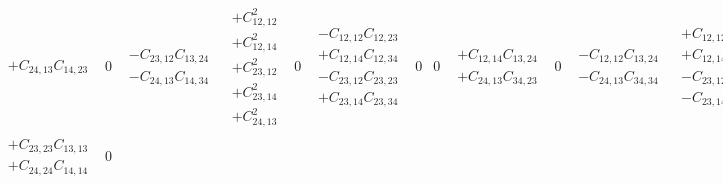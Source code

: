 \documentclass[pra,nofootinbib]{revtex4-1}
\newcommand{\C}[2]{C_{{#1},{#2}}}
\begin{document}
\begin{eqnarray}
\begin{array}{cccccccccccccccc}
\begin{array}{c}
     + \C{24}{13}\C{14}{23}
     \end{array} &
     0 &
     \begin{array}{c}
     - \C{23}{12}\C{13}{24} \\
     - \C{24}{13}\C{14}{34}
     \end{array} &
     \begin{array}{c}
     + \C{12}{12}^2 \\
     + \C{12}{14}^2 \\
     + \C{23}{12}^2 \\
     + \C{23}{14}^2 \\
     + \C{24}{13}^2
     \end{array} &
     0 &
     \begin{array}{c}
     - \C{12}{12}\C{12}{23} \\
     + \C{12}{14}\C{12}{34} \\
     - \C{23}{12}\C{23}{23} \\
     + \C{23}{14}\C{23}{34}
     \end{array} &
     0 &
     0 &
     \begin{array}{c}
     + \C{12}{14}\C{13}{24} \\
     + \C{24}{13}\C{34}{23}
     \end{array} &
     0 &
     \begin{array}{c}
     - \C{12}{12}\C{13}{24} \\
     - \C{24}{13}\C{34}{34}
     \end{array} &
     \begin{array}{c}
     + \C{12}{12}\C{14}{12} \\
     + \C{12}{14}\C{14}{14} \\
     - \C{23}{12}\C{34}{12} \\
     - \C{23}{14}\C{34}{14}
     \end{array} &
     0 &
     \begin{array}{c}
     - \C{12}{12}\C{14}{23} \\
     + \C{12}{14}\C{14}{34} \\
     + \C{23}{12}\C{34}{23} \\
     - \C{23}{14}\C{34}{34}
     \end{array} &
     0 \\
     \begin{array}{c}
     + \C{23}{23}\C{13}{13} \\
     + \C{24}{24}\C{14}{14}
     \end{array} &
     0 &
     \begin{array}{c}

\end{array}
\end{array}
\end{eqnarray}
\end{document}
